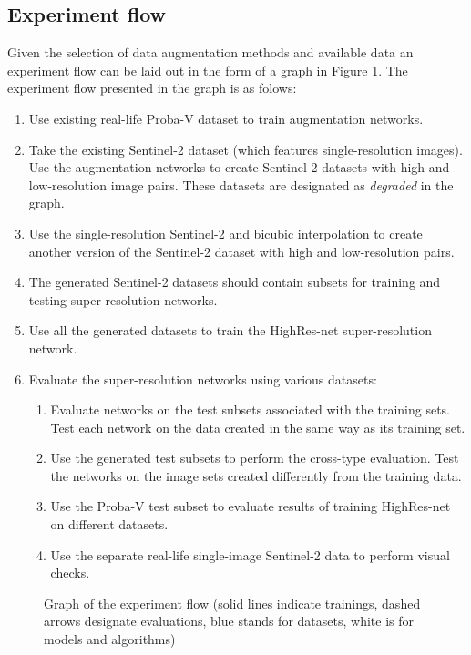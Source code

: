 \subsection{Experiment flow}
Given the selection of data augmentation methods and available data an experiment flow can be laid out in the form of a graph in Figure \ref{fig:experiment-flow}.
The experiment flow presented in the graph is as folows:
\begin{enumerate}
	\item Use existing real-life Proba-V dataset to train augmentation networks.
	\item Take the existing Sentinel-2 dataset (which features single-resolution images). Use the augmentation networks to create Sentinel-2 datasets with high and low-resolution image pairs. These datasets are designated as \textit{degraded} in the graph.
	\item Use the single-resolution Sentinel-2 and bicubic interpolation to create another version of the Sentinel-2 dataset with high and low-resolution pairs.
	\item The generated Sentinel-2 datasets should contain subsets for training and testing super-resolution networks.
	\item Use all the generated datasets to train the HighRes-net super-resolution network.
	\item Evaluate the super-resolution networks using various datasets:
	\begin{enumerate}
		\item Evaluate networks on the test subsets associated with the training sets. Test each network on the data created in the same way as its training set.
		\item Use the generated test subsets to perform the cross-type evaluation. Test the networks on the image sets created differently from the training data.
		\item Use the Proba-V test subset to evaluate results of training HighRes-net on different datasets.
		\item Use the separate real-life single-image Sentinel-2 data to perform visual checks.
	\end{enumerate} 
\end{enumerate}
\begin{figure}
	\centering
	
	\caption{Graph of the experiment flow (solid lines indicate trainings, dashed arrows designate evaluations, blue stands for datasets, white is for models and algorithms)}
	\label{fig:experiment-flow}
\end{figure}

